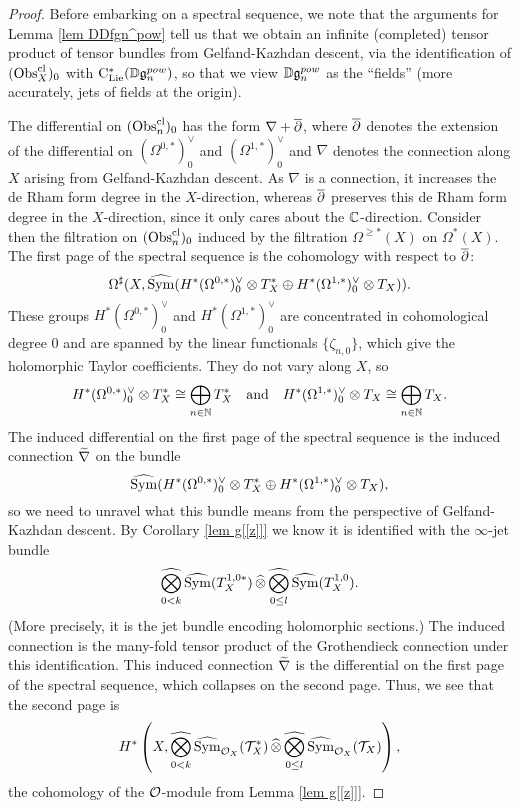 \begin{proof}
Before embarking on a spectral sequence, we note that the arguments
for Lemma \ref{lem DDfgn^pow} tell us that we obtain an infinite (completed) tensor product
of tensor bundles from Gelfand-Kazhdan descent,
via the identification of $(\Obs^\cl_X)_0$ with $\clies(\DD\fgn^{pow})$,
so that we view $\DD\fgn^{pow}$ as the ``fields'' (more accurately, jets of fields at the origin).

The differential on $(\Obs^\cl_n)_0$ has the form $\nabla + \dbar$, 
where $\dbar$ denotes the extension of the differential on $(\Omega^{0,*})^\vee_0$ and $(\Omega^{1,*})^\vee_0$
and $\nabla$ denotes the connection along $X$ arising from Gelfand-Kazhdan descent.
As $\nabla$ is a connection, it increases the de Rham form degree in the $X$-direction, 
whereas $\dbar$ preserves this de Rham form degree in the $X$-direction, since it only cares about the $\CC$-direction.
Consider then the filtration on $(\Obs^\cl_n)_0$ induced by the filtration $\Omega^{\geq *}(X)$ on $\Omega^*(X)$.
The first page of the spectral sequence is the cohomology with respect to $\dbar$:
\[
\Omega^\sharp(X, \cSym(H^*(\Omega^{0,*})^\vee_0 \otimes T^*_X \oplus H^*(\Omega^{1,*})^\vee_0 \otimes T_X)).
\]
These groups $H^*(\Omega^{0,*})^\vee_0$ and $H^*(\Omega^{1,*})^\vee_0$
are concentrated in cohomological degree 0 and are spanned by the linear functionals $\{\zeta_{n,0}\}$, which give the holomorphic Taylor coefficients.
They do not vary along $X$, so
\[
H^*(\Omega^{0,*})^\vee_0 \otimes T^*_X \cong \bigoplus_{n \in \NN} T^*_X \quad \text{and} \quad H^*(\Omega^{1,*})^\vee_0 \otimes T_X \cong \bigoplus_{n \in \NN} T_X.
\]
The induced differential on the first page of the spectral sequence is the induced connection $\Tilde{\nabla}$ on the bundle
\[
\cSym(H^*(\Omega^{0,*})^\vee_0 \otimes T^*_X \oplus H^*(\Omega^{1,*})^\vee_0 \otimes T_X),
\]
so we need to unravel what this bundle means from the perspective of Gelfand-Kazhdan descent.
By Corollary \ref{lem g[[z]]} we know it is identified with the $\infty$-jet bundle 
\[
\underset{{0<k}}{\widehat{\bigotimes}}\,\cSym(T^{1,0*}_X)\, \widehat{\otimes}\, \underset{{0\leq l}}{\widehat{\bigotimes}}\,\cSym(T^{1,0}_X).
\]
(More precisely, it is the jet bundle encoding holomorphic sections.)
The induced connection is the many-fold tensor product of the Grothendieck connection under this identification.
This induced connection $\Tilde{\nabla}$ is the differential on the first page of the spectral sequence, which collapses on the second page.
Thus, we see that the second page is
\[
H^*\left(X,\underset{{0<k}}{\widehat{\bigotimes}}\,\cSym_{\cO_X}(\cT^*_X)\, \widehat{\otimes}\, \underset{{0\leq l}}{\widehat{\bigotimes}}\,\cSym_{\cO_X}(\cT_X)\right),
\]
the cohomology of the $\cO$-module from Lemma \ref{lem g[[z]]}.
\end{proof}

